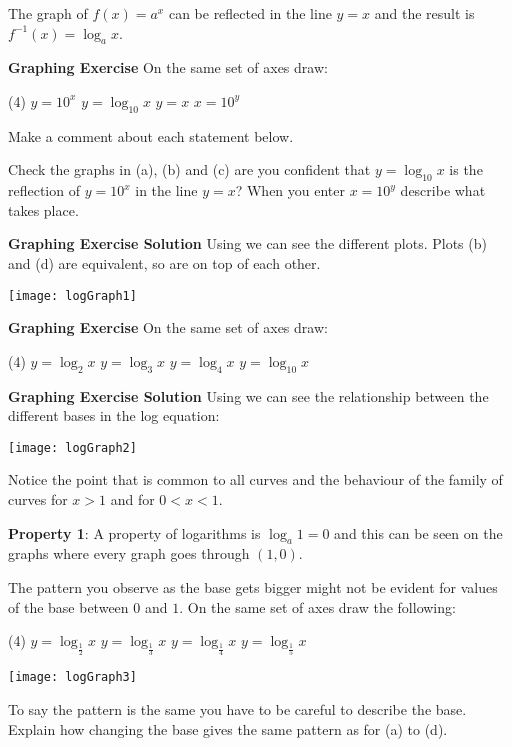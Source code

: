 The graph of $f (x) =a^{x}$ can be reflected in the line $y =x$ and the result is $f^{ -1} (x) =\log _{a} x$. 

\textbf{Graphing Exercise} On the same set of axes draw:
\begin{tasks}(4)
	\task $y =10^{x}$ 
	\task $y =\log _{10} x$ 
	\task $y =x$ 
	\task $x =10^{y}$ 
\end{tasks}

Make a comment about each statement below. 
\begin{tasks}
	\task[1.] Check the graphs in (a), (b) and (c) are you confident that $y =\log _{10} x$ is the reflection of $y =10^{x}$ in the line $y =x$?
	\task[2.] When you enter $x =10^{y}$ describe what takes place.
	\end{tasks}

\textbf{Graphing Exercise Solution} Using \desmos we can see the different plots. Plots (b) and (d) are equivalent, so are on top of each other.\\
\begin{center}
\texttt{[image: logGraph1]}\\
\end{center}

\textbf{Graphing Exercise} On the same set of axes draw:
\begin{tasks}(4)
	\task $y =\log _{2} x$ 
	\task $y =\log _{3} x$ 
	\task $y =\log _{4} x$ 
	\task $y =\log _{10} x$ \end{tasks}
\textbf{Graphing Exercise Solution} Using \desmos we can see the relationship between the different bases in the log equation:\\
\begin{center}\texttt{[image: logGraph2]}\end{center}
Notice the point that is common to all curves and the behaviour of the family of curves for $x >1$ and for $0 <x <1$. 

\textbf{Property 1}: A property of logarithms is $\log _{a} 1 =0$ and this can be seen on the graphs where every graph goes through $\left (1 ,0\right )$. 

The pattern you observe as the base gets bigger might not be evident for values of the base between $0$ and $1$. On the same set of axes draw the following: 

\begin{tasks}(4)
	\task $y =\log _{\frac{1}{2}} x$ 
\task $y =\log _{\frac{1}{3}} x$ 
	\task $y =\log _{\frac{1}{4}} x$ 
	\task $y =\log _{\frac{1}{5}} x$ \end{tasks}
\begin{center}\texttt{[image: logGraph3]}\end{center}
To say the pattern is the same you have to be careful to describe the base. Explain how changing the base gives the same pattern as for (a) to (d).

